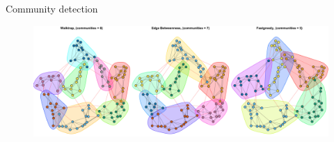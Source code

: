 \documentclass[serif, aspectratio=169]{beamer}
\begin{document}
\begin{frame}
{Community detection}

\begin{figure} \includegraphics{figure/sample_smallworld_communities}
\end{figure}

\end{frame}
\end{document}
